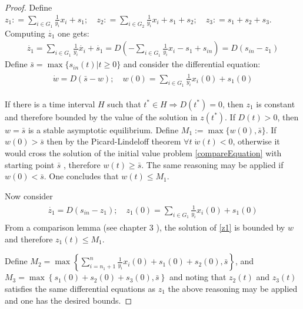 \documentclass[processes,article,submit,moreauthors,pdftex]{Definitions/mdpi}
\begin{document}
\begin{proof}
	Define $ \displaystyle z_1 : = \sum \limits_{i \in G_1} \frac{1}{y_i}x_i + s_1  ;\quad 
	z_2 : = \sum \limits_{i \in G_2} \frac{1}{y_i}x_i + s_1 + s_2 ;\quad 
	z_3 : = s_1 + s_2 + s_3$. Computing $\dot{z_{1}}$ one gets:
	\begin{align*}
	\dot{z_{1}} =\sum \limits_{i \in G_1} \frac{1}{y_i}\dot{x_i} + \dot{s_1} = D\left(-\sum \limits_{i \in G_1} \frac{1}{y_i}x_i - s_1 + s_{in}\right)  = D(s_{in} - z_1)
	\end{align*}
	Define $\bar{s} =\max\{s_{in}(t) | t\geq 0\}$ and consider the differential equation:
	\begin{align}
	\label{compareEquation}
	\begin{array}{l}
	\dot{w} = D(\bar{s} - w) ; \quad 
	w(0) = \sum \limits_{i \in G_1} \frac{1}{y_i}x_i(0) + s_1(0)
	\end{array}
	\end{align}
	
	If there is a time interval $H$ such that $t^*\in H  \Rightarrow D(t^*) = 0$, then $z_1$ is constant and therefore bounded by  the value of the solution in $z(t^*)$. 
	If $D(t) > 0$, then $w = \bar{s}$ is a stable asymptotic equilibrium. Define $M_1 :=  \max\{w(0),\bar{s}\}$. If $ w(0) > \bar{s}$ then by the Picard-Lindeloff theorem $ \forall t \; \dot{w}(t) < 0 $, otherwise it would cross the solution of the initial value problem \eqref{compareEquation} with starting point $\bar{s}$ , therefore $w(t) \geq \bar{s}$. The same reasoning may be applied if $ w(0) < \bar{s}$. One concludes that $ w(t) \leq M_1 $. 
	
	Now consider  
	\begin{align}
	\label{z1} \begin{array}{l}
	\dot{z_1} =  D(s_{in} - z_1) ;\quad 
	z_1(0) = \sum \limits_{i \in G_1} \frac{1}{y_i}x_i(0) + s_1(0)
	\end{array} 
	\end{align}
	From a comparison lemma (see chapter 3 \cite{Khalil1996}), the solution of \eqref{z1} is bounded by $w$ and therefore $z_1(t) \leq M_1$.
	
	Define $M_2 = \max\left \{ \displaystyle \sum \limits_{i=n_1 +1 }^{n} \frac{1}{y_i}x_i(0) + s_1(0) +s_2(0), \bar{s} \right\}$, and $M_3 =\max\left \{ s_1(0) +s_2(0) + s_3(0), \bar{s} \right\} $ and noting that $z_2(t)$ and $z_3(t)$ satisfies the same differential equations as $z_1$ the above reasoning may be applied and one has the desired bounds.
\end{proof}
\end{document}
